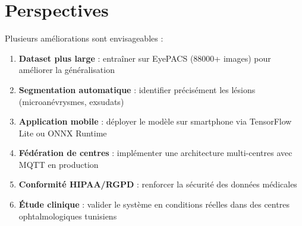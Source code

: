 \documentclass[12pt,a4paper,oneside]{report}
\begin{document}
\section*{Perspectives}

Plusieurs améliorations sont envisageables :
\begin{enumerate}
    \item \textbf{Dataset plus large} : entraîner sur EyePACS (88000+ images)
          pour améliorer la généralisation
    \item \textbf{Segmentation automatique} : identifier précisément
          les lésions (microanévrysmes, exsudats)
    \item \textbf{Application mobile} : déployer le modèle sur smartphone
          via TensorFlow Lite ou ONNX Runtime
    \item \textbf{Fédération de centres} : implémenter une architecture
          multi-centres avec MQTT en production
    \item \textbf{Conformité HIPAA/RGPD} : renforcer la sécurité des
          données médicales
    \item \textbf{Étude clinique} : valider le système en conditions réelles
          dans des centres ophtalmologiques tunisiens
\end{enumerate}
\end{document}
